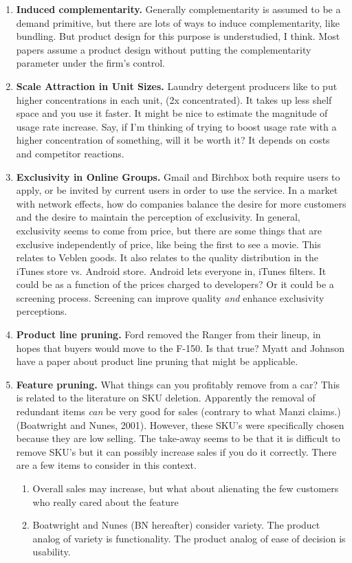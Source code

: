 \documentclass[paper=a4, fontsize=11pt]{scrartcl} %
\numberwithin{equation}{section} %
\numberwithin{figure}{section} %
\numberwithin{table}{section} %
\begin{document}
\begin{enumerate}
\item \textbf{Induced complementarity.}  Generally complementarity is assumed to be a demand primitive, but there are lots of ways to induce complementarity, like bundling.  But product design for this purpose is understudied, I think.  Most papers assume a product design without putting the complementarity parameter under the firm's control.

\item \textbf{Scale Attraction in Unit Sizes.}  Laundry detergent producers like to put higher concentrations in each unit, (2x concentrated).  It takes up less shelf space and you use it faster.  It might be nice to estimate the magnitude of usage rate increase.  Say, if I'm thinking of trying to boost usage rate with a higher concentration of something, will it be worth it?  It depends on costs and competitor reactions.

\item \textbf{Exclusivity in Online Groups.}  Gmail and Birchbox both require users to apply, or be invited by current users in order to use the service.  In a market with network effects, how do companies balance the desire for more customers and the desire to maintain the perception of exclusivity.  In general, exclusivity seems to come from price, but there are some things that are exclusive independently of price, like being the first to see a movie.  This relates to Veblen goods.  It also relates to the quality distribution in the iTunes store vs. Android store.  Android lets everyone in, iTunes filters.  It could be as a function of the prices charged to developers?  Or it could be a screening process.  Screening can improve quality \textit{and} enhance exclusivity perceptions. 

\item \textbf{Product line pruning.}  Ford removed the Ranger from their lineup, in hopes that buyers would move to the F-150.  Is that true?  Myatt and Johnson have a paper about product line pruning that might be applicable. 

\item \textbf{Feature pruning.}  What things can you profitably remove from a car?  This is related to the literature on SKU deletion.  Apparently the removal of redundant items \textit{can} be very good for sales (contrary to what Manzi claims.) (Boatwright and Nunes, 2001).  However, these SKU's were specifically chosen because they are low selling.  The take-away seems to be that it is difficult to remove SKU's but it can possibly increase sales if you do it correctly.  There are a few items to consider in this context. 
	\begin{enumerate}
	\item Overall sales may increase, but what about alienating the few customers who really cared about the feature
	\item Boatwright and Nunes (BN hereafter) consider variety.  The product analog of variety is functionality.  The product analog of ease of decision is usability.   
	\end{enumerate}


\end{enumerate}
\end{document}
